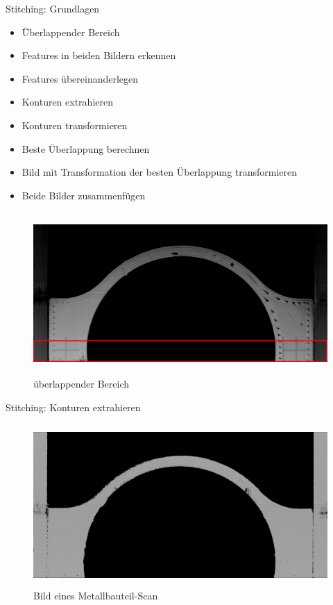 \documentclass[../slides.tex]{subfiles}
\begin{document}
\begin{frame}{Stitching: Grundlagen}
    \begin{minipage}[t]{.5\textwidth}
        \begin{itemize}
            \item Überlappender Bereich
            \item Features in beiden Bildern erkennen
            \item Features übereinanderlegen
            \item Konturen extrahieren
            \item Konturen transformieren
            \item Beste Überlappung berechnen
            \item Bild mit Transformation der besten Überlappung transformieren
            \item Beide Bilder zusammenfügen
        \end{itemize}
        \end{minipage}
        \hfill
        \begin{minipage}[t]{.45\textwidth}
        \begin{figure}[]
            \includegraphics[angle=90, height=175pt]{img_niklas/fdm_top_10p_red.png}
            \caption{überlappender Bereich}
            \label{fig:versuchsaufbau}
        \end{figure}
        \end{minipage}
\end{frame}

\begin{frame}{Stitching: Konturen extrahieren}
    \begin{figure}
        \centering
        \includegraphics[height=175pt]{img_niklas/top.png}
        \caption{Bild eines Metallbauteil-Scan}
        \label{fig:ampic}
    \end{figure}
\end{frame}
\end{document}
